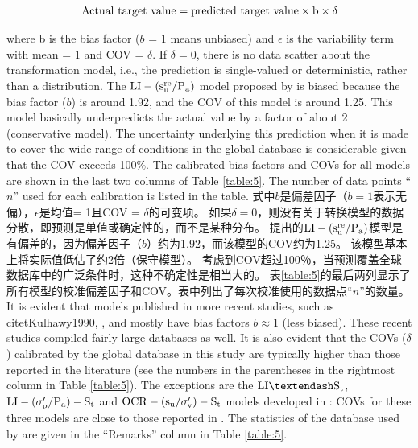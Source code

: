 \begin{Parallel}{0.60\textwidth}{}
{    }
    \ParallelPar
    \begin{align}
        \rm{Actual~ target~value = predicted~target~value\times{}b\times{}\delta}
        \label{equal:1}
    \end{align}
    
    \ParallelLText
    {
        where b is the bias factor ($b$ = 1 means unbiased) and $\epsilon$ is the variability term with mean = 1 and COV = $\delta$. If $\delta = 0$, there is no data scatter about the transformation model, i.e., the prediction is single-valued or deterministic, rather than a distribution. The $\rm{LI}-(s_u^{re}/P_a)$ model proposed by \citet{Locat1988799} is biased because the bias factor ($b$) is around 1.92, and the COV of this model is around 1.25. This model basically underpredicts the actual value by a factor of about 2 (conservative model). The uncertainty underlying this prediction when it is made to cover the wide range of conditions in the global database is considerable given that the COV exceeds 100$\%$. The calibrated bias factors and COVs for all models are shown in the last two columns of Table \ref{table:5}. The number of data points “$n$” used for each calibration is listed in the table.
    }
    \ParallelRText
    {
        式中$b$是偏差因子（$b = 1$表示无偏），$\epsilon$是均值= 1且COV = $ \delta $的可变项。 如果$ \delta = 0 $，则没有关于转换模型的数据分散，即预测是单值或确定性的，而不是某种分布。 \citet{Locat1988799}提出的$\rm{LI}-(s_u^{re}/P_a)$模型是有偏差的，因为偏差因子（$b$）约为1.92，而该模型的COV约为1.25。 该模型基本上将实际值低估了约2倍（保守模型）。 考虑到COV超过100％，当预测覆盖全球数据库中的广泛条件时，这种不确定性是相当大的。 表\ref{table:5}的最后两列显示了所有模型的校准偏差因子和COV。表中列出了每次校准使用的数据点“$n$”的数量。
    }
    \ParallelPar
    \ParallelLText
    {
        It is evident that models published in more recent studies, such as citet{Kulhawy1990}, \citet{Chen1996488}, and \citet{Ching201252, Ching2012522} mostly have bias factors $b\approx{}1$ (less biased). These recent studies compiled fairly large databases as well. It is also evident that the COVs ($\delta$) calibrated by the global database in this study are typically higher than those reported in the literature (see the numbers in the parentheses in the rightmost column in Table \ref{table:5}). The exceptions are the $\rm{LI}–S_t$, $\rm{LI}-(\sigma_p'/P_a)-S_t$ and $\rm{OCR}-(s_u/\sigma_v')-S_t$ models developed in \citet{Ching2012522}: COVs for these three models are close to those reported in \citet{Ching2012522}. The statistics of the database used by \citet{Ching2012522} are given in the “Remarks” column in Table \ref{table:5}. 
}
\end{Parallel}
